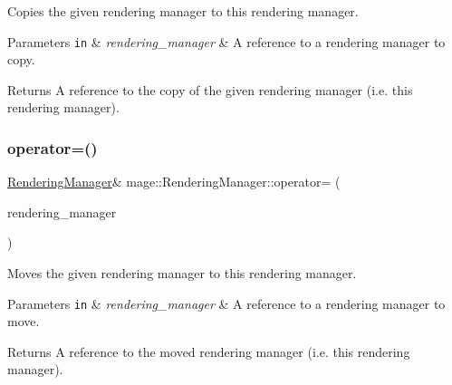 Copies the given rendering manager to this rendering manager.


\begin{DoxyParams}[1]{Parameters}
\mbox{\tt in}  & {\em rendering\+\_\+manager} & A reference to a rendering manager to copy. \\
\hline
\end{DoxyParams}
\begin{DoxyReturn}{Returns}
A reference to the copy of the given rendering manager (i.\+e. this rendering manager). 
\end{DoxyReturn}
\hypertarget{classmage_1_1_rendering_manager_a6f71bc364063de61d07490ef9896158c}{}\label{classmage_1_1_rendering_manager_a6f71bc364063de61d07490ef9896158c} 
\subsubsection{\texorpdfstring{operator=()}{operator=()}\hspace{0.1cm}{\footnotesize\ttfamily [2/2]}}
{\footnotesize\ttfamily \hyperlink{classmage_1_1_rendering_manager}{Rendering\+Manager}\& mage\+::\+Rendering\+Manager\+::operator= (\begin{DoxyParamCaption}\item[{\hyperlink{classmage_1_1_rendering_manager}{Rendering\+Manager} \&\&}]{rendering\+\_\+manager }\end{DoxyParamCaption})\hspace{0.3cm}{\ttfamily [delete]}}

Moves the given rendering manager to this rendering manager.


\begin{DoxyParams}[1]{Parameters}
\mbox{\tt in}  & {\em rendering\+\_\+manager} & A reference to a rendering manager to move. \\
\hline
\end{DoxyParams}
\begin{DoxyReturn}{Returns}
A reference to the moved rendering manager (i.\+e. this rendering manager). 
\end{DoxyReturn}
\hypertarget{classmage_1_1_rendering_manager_a45d4cadcd572290f352027b5fa86b4f6}{}\label{classmage_1_1_rendering_manager_a45d4cadcd572290f352027b5fa86b4f6} 
